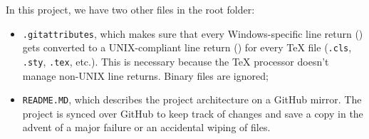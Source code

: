 \noindent In this project, we have two other files in the root folder:
\begin{itemize}
    \item \texttt{.gitattributes}, which makes sure that every Windows-specific line return () gets converted to a UNIX-compliant line return () for every \TeX{} file (\texttt{.cls}, \texttt{.sty}, \texttt{.tex}, etc.). This is necessary because the \TeX{} processor doesn't manage non-UNIX line returns. Binary files are ignored;
    \item \texttt{README.MD}, which describes the project architecture on a GitHub mirror. The project is synced over GitHub to keep track of changes and save a copy in the advent of a major failure or an accidental wiping of files.
\end{itemize}